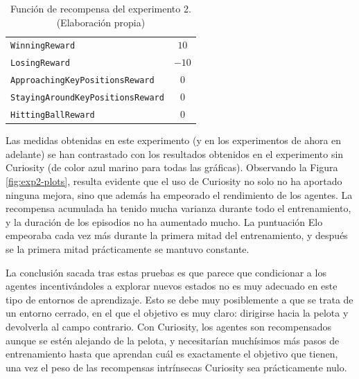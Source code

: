 \begin{table}[H]
\centering
    \begin{tabular}{|>{\rowmac}p{6.5cm}|>{\rowmac}c<{\clearrow}|} 
        \hline
        \multicolumn{1}{|c|}{\textbf{Recompensa}} & \multicolumn{1}{c|}{\textbf{Valor}} \\ \hline \hline
        \texttt{WinningReward} & $10$ \\
        \hline
        \texttt{LosingReward} & $-10$ \\
        \hline
        \texttt{ApproachingKeyPositionsReward} & $0$ \\
        \hline
        \texttt{StayingAroundKeyPositionsReward} & $0$ \\
        \hline
        \texttt{HittingBallReward} & $0$ \\
        \hline
    \end{tabular}
    \caption[Función de recompensa del experimento 2]{Función de recompensa del experimento 2. (Elaboración propia)}
    \label{tab:exp2-rewards}
\end{table}
Las medidas obtenidas en este experimento (y en los experimentos de ahora en adelante) se han contrastado con los resultados obtenidos en el experimento sin Curiosity (de color azul marino para todas las gráficas). Observando la Figura \ref{fig:exp2-plots}, resulta evidente que el uso de Curiosity no solo no ha aportado ninguna mejora, sino que además ha empeorado el rendimiento de los agentes. La recompensa acumulada ha tenido mucha varianza durante todo el entrenamiento, y la duración de los episodios no ha aumentado mucho. La puntuación Elo empeoraba cada vez más durante la primera mitad del entrenamiento, y después se la primera mitad prácticamente se mantuvo constante.

La conclusión sacada tras estas pruebas es que parece que condicionar a los agentes incentivándoles a explorar nuevos estados no es muy adecuado en este tipo de entornos de aprendizaje. Esto se debe muy posiblemente a que se trata de un entorno cerrado, en el que el objetivo es muy claro: dirigirse hacia la pelota y devolverla al campo contrario. Con Curiosity, los agentes son recompensados aunque se estén alejando de la pelota, y necesitarían muchísimos más pasos de entrenamiento hasta que aprendan cuál es exactamente el objetivo que tienen, una vez el peso de las recompensas intrínsecas Curiosity sea prácticamente nulo.

